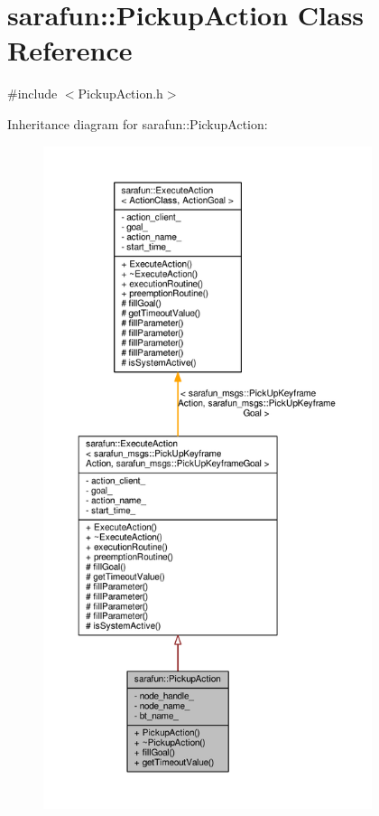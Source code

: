 \hypertarget{classsarafun_1_1PickupAction}{\section{sarafun\-:\-:Pickup\-Action Class Reference}
\label{classsarafun_1_1PickupAction}
}


{\ttfamily \#include $<$Pickup\-Action.\-h$>$}



Inheritance diagram for sarafun\-:\-:Pickup\-Action\-:
\nopagebreak
\begin{figure}[H]
\begin{center}
\leavevmode
\includegraphics[height=550pt]{db/de1/classsarafun_1_1PickupAction__inherit__graph}
\end{center}
\end{figure}


